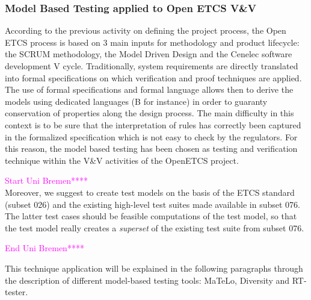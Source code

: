 \documentclass{template/openetcs_report}
\begin{document}
\subsubsection{Model Based Testing applied to Open ETCS V\&V}
According to the previous activity on defining the project process, 
the Open ETCS process is based on 3 main inputs for methodology and 
product lifecycle: the SCRUM methodology, the Model Driven Design and the
 Cenelec software development V cycle.
Traditionally, system requirements are directly translated into formal specifications
 on which verification and proof techniques are applied. The use of formal 
specifications and formal language allows then to derive the models using dedicated
 languages (B for instance) in order to guaranty conservation of properties along 
the design process. The main difficulty in this context is to be sure that the
 interpretation of rules has correctly been captured in the formalized specification
 which is not easy to check by the regulators. For this reason, the model based testing
 has been chosen as testing and verification technique within the V\&V activities of
 the OpenETCS project. 

\textcolor{magenta}{Start Uni Bremen****\\ }
Moreover, we suggest to create test models on the basis of the ETCS standard (subset 026) and
the existing high-level test suites made available in subset 076. The latter test cases should 
be feasible computations of the test model, so that the test model really creates a {\it superset}
of the existing test suite from subset 076.

\textcolor{magenta}{End Uni Bremen****\\ }

This technique application will be explained in the following
 paragraphs through the description of different model-based testing tools: 
MaTeLo, Diversity and RT-tester. 
\end{document}
